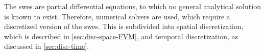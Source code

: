
The \glspl{swe} are partial differential equations, to which no general analytical solution is known to exist.
Therefore, numerical solvers are used, which require a discretized version of the \glspl{swe}. 
This is subdivided into spatial discretization, which is described in \autoref{sec:disc-space-FVM}, and temporal discretization, as discussed in \autoref{sec:disc-time}.

